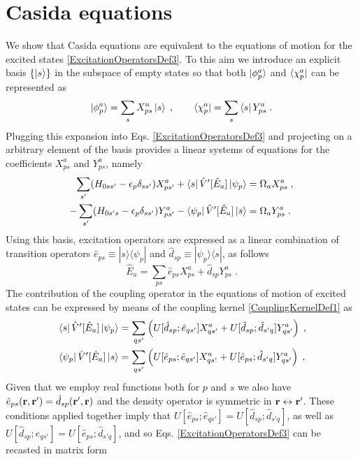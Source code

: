 \documentclass[reprint,aps,prb]{revtex4-1}
\renewcommand{\r}{{\bf r}}
\newcommand{\eps}{\epsilon}
\newcommand{\be}{\begin{equation}}
\newcommand{\ee}{\end{equation}}
\newcommand{\nn}{\notag}
\newcommand{\qq}{\qquad}
\newcommand{\lb}{\label}
\newcommand{\op}[1]{\hat {#1}}
\newcommand{\ketbra}[2]{| #1 \rangle \langle #2 |}
\newcommand{\excite}[2]{\op e_{{#1}{#2}}}
\newcommand{\decay}[2]{\op d_{{#1}{#2}}}
\begin{document}
\section{Casida equations}
\label{casida}

We show that Casida equations are equivalent to the equations of motion for the excited states \eqref{ExcitationOperatorsDef3}. To this aim we introduce an explicit basis $\{\ket{s}\}$
in the subspace of empty states so that both $\ket{\phi^a_p}$ and $\bra{\chi^a_p}$ can be represented as
\be
\ket{\phi^a_p} = \sum_s X^a_{p s}\ket{s} \;, \qq
\bra{\chi^a_p} = \sum_s\bra{s}Y^a_{p s} \;. \lb{phiandchi}
\ee
Plugging this expansion into Eqs. \eqref{ExcitationOperatorsDef3} and projecting on a arbitrary element of the basis provides a linear systems of equations for the coefficients
$X^a_{ps}$ and $Y^a_{ps}$, namely
\begin{align}
 \sum_{s'}(H_{0ss'}-\eps_p\delta_{ss'})X^a_{ps'} + \bra{s}\op V'[\op E_a]\ket{\psi_p} &= \Omega_a X^a_{ps} \;, \nn \\
 -\sum_{s'} (H_{0 s' s}-\eps_p\delta_{s s'})Y^a_{ps'} - \bra{\psi_p}\op V'[\op E_a]\ket{s}& = \Omega_a Y^a_{ps} \;. \nn
\end{align}
Using this basis, excitation operators are expressed as a linear combination of transition operators $\excite{p}{s} \equiv \ketbra{s}{\psi_p}$ and $\decay{s}{p} \equiv \ketbra{\psi_p}{s}$,
as follows
\be\lb{ExcitationOpBasisTransition1}
\op E_a = \sum_{ps}\excite{p}{s}X^a_{ps}+\decay{s}{p}Y^a_{ps} \;.
\ee
The contribution of the coupling operator in the equations of motion of excited states can be expressed by means of the coupling kernel \eqref{CouplingKernelDef1} as
\begin{align}
& \bra{s}\op V'[\op E_a]\ket{\psi_p} = \sum_{qs'}\left(U[\decay{s}{p};\excite{q}{s'}]X^a_{qs'} + U[\decay{s}{p};\decay{s'}{q}]Y^a_{qs'}\right) \;,\nn \\
& \bra{\psi_p}\op V'[\op E_a]\ket{s} = \sum_{qs'}\left(U[\excite{p}{s};\excite{q}{s'}]X^a_{qs'} + U[\excite{p}{s};\decay{s'}{q}]Y^a_{qs'}\right) \;, \nn
\end{align}
Given that we employ real functions both for $p$ and $s$ we also have $\excite{p}{s}(\r,\r') = \decay{s}{p}(\r',\r)$ and the density operator is symmetric in $\r \leftrightarrow \r'$.
These conditions applied together imply that $U[\excite{p}{s};\excite{q}{s'}] = U[\decay{s}{p};\decay{s'}{q}]$, as well as $U[\decay{s}{p};\excite{q}{s'}] = U[\excite{p}{s};\decay{s'}{q}]$,
and so Eqs. \eqref{ExcitationOperatorsDef3} can be recasted in matrix form
\end{document}
